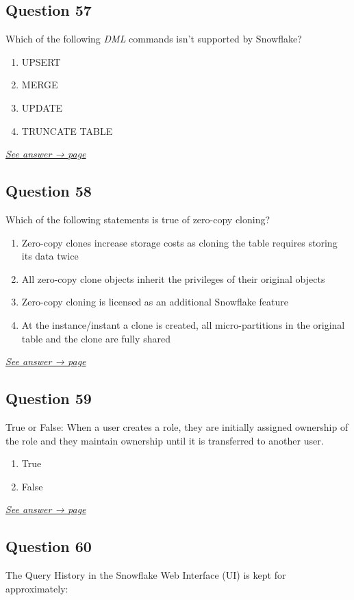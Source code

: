 \documentclass[12pt]{article}
\newcommand{\seeanswer}[1]{%
  \par\smallskip\emph{\hyperref[ans:#1]{See answer → page \pageref{ans:#1}}}%
}
\begin{document}
\subsection*{Question 57}\label{q:57}
Which of the following \textit{DML} commands isn’t supported by Snowflake?

\begin{enumerate}[label=\Alph*.]
  \item UPSERT
  \item MERGE
  \item UPDATE
  \item TRUNCATE TABLE
\end{enumerate}
\seeanswer{57}

\subsection*{Question 58}\label{q:58}
Which of the following statements is true of zero-copy cloning?

\begin{enumerate}[label=\Alph*.]
  \item Zero-copy clones increase storage costs as cloning the table requires storing its data twice
  \item All zero-copy clone objects inherit the privileges of their original objects
  \item Zero-copy cloning is licensed as an additional Snowflake feature
  \item At the instance/instant a clone is created, all micro-partitions in the original table and the clone are fully shared
\end{enumerate}
\seeanswer{58}

\subsection*{Question 59}\label{q:59}
True or False: When a user creates a role, they are initially assigned ownership of the role and they maintain ownership until it is transferred to another user.

\begin{enumerate}[label=\Alph*.]
  \item True
  \item False
\end{enumerate}
\seeanswer{59}

\subsection*{Question 60}\label{q:60}
The Query History in the Snowflake Web Interface (UI) is kept for approximately:
\end{document}
